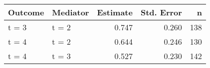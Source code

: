 \begingroup
\fontsize{12.0pt}{14.4pt}\selectfont
\begin{longtable}{llrrr}
\toprule
Outcome & Mediator & Estimate & Std. Error & n \\ 
\midrule\addlinespace[2.5pt]
t = 3 & t = 2 & 0.747 & 0.260 & 138 \\ 
t = 4 & t = 2 & 0.644 & 0.246 & 130 \\ 
t = 4 & t = 3 & 0.527 & 0.230 & 142 \\ 
\bottomrule
\end{longtable}
\endgroup

